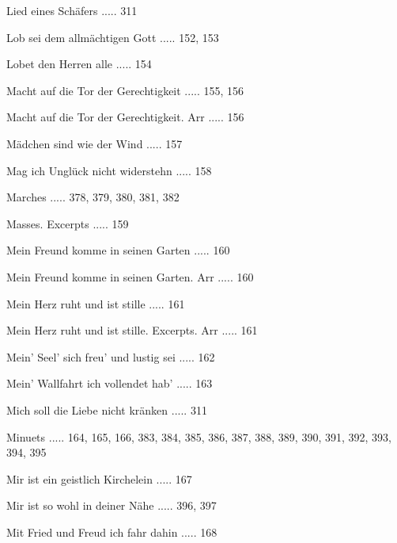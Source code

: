 \documentclass[twocolumn]{book}
\begin{document}
\newline 
Lied eines Schäfers ..... 311

\newline 
Lob sei dem allmächtigen Gott ..... 152, 153

\newline 
Lobet den Herren alle ..... 154

\newline 
Macht auf die Tor der Gerechtigkeit ..... 155, 156

\newline 
Macht auf die Tor der Gerechtigkeit. Arr ..... 156

\newline 
Mädchen sind wie der Wind ..... 157

\newline 
Mag ich Unglück nicht widerstehn ..... 158

\newline 
Marches ..... 378, 379, 380, 381, 382

\newline 
Masses. Excerpts ..... 159

\newline 
Mein Freund komme in seinen Garten ..... 160

\newline 
Mein Freund komme in seinen Garten. Arr ..... 160

\newline 
Mein Herz ruht und ist stille ..... 161

\newline 
Mein Herz ruht und ist stille. Excerpts. Arr ..... 161

\newline 
Mein' Seel' sich freu' und lustig sei ..... 162

\newline 
Mein' Wallfahrt ich vollendet hab' ..... 163

\newline 
Mich soll die Liebe nicht kränken ..... 311

\newline 
Minuets ..... 164, 165, 166, 383, 384, 385, 386, 387, 388, 389, 390, 391, 392, 393, 394, 395

\newline 
Mir ist ein geistlich Kirchelein ..... 167

\newline 
Mir ist so wohl in deiner Nähe ..... 396, 397

\newline 
Mit Fried und Freud ich fahr dahin ..... 168
\end{document}
